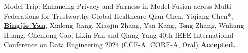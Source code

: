 \begin{cvpublications}

\cvpublication
{Model Trip: Enhancing Privacy and Fairness in Model Fusion across Multi-Federations for Trustworthy Global Healthcare} %
{Qian Chen, Yiqiang Chen*, \underline{\textbf{Bingjie Yan}}, Xinlong Jiang, Xiaojin Zhang, Yan Kang, Teng Zhang, Wuliang Huang, Chenlong Gao, Lixin Fan and Qiang Yang} %
{40th IEEE International Conference on Data Engineering} %
{2024} %
{(CCF-A, CORE-A\ast, \textcolor{awesome}{Oral})} %
{\textbf{Accepted.}} %



\end{cvpublications}

